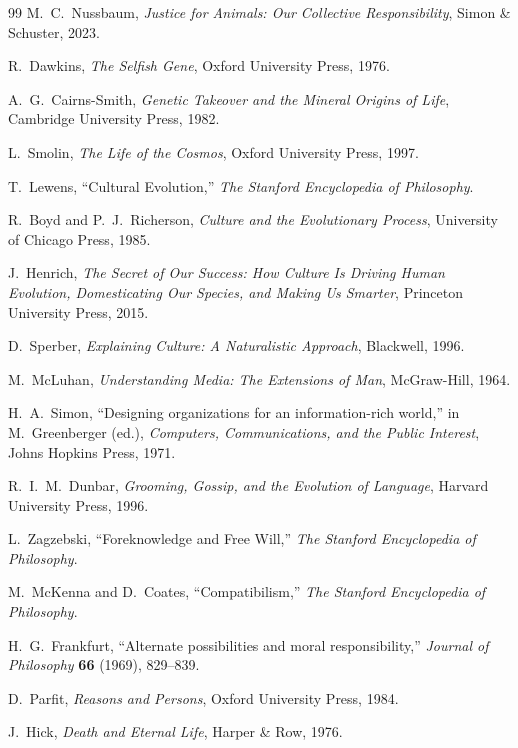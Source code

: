 \documentclass[11pt]{article}
\theoremstyle{remark}
\theoremstyle{plain}
\begin{document}
\begin{thebibliography}{99}
M.\ C.\ Nussbaum,
\emph{Justice for Animals: Our Collective Responsibility},
Simon \& Schuster, 2023.

R.\ Dawkins,
\emph{The Selfish Gene},
Oxford University Press, 1976.

A.\ G.\ Cairns-Smith,
\emph{Genetic Takeover and the Mineral Origins of Life},
Cambridge University Press, 1982.

L.\ Smolin,
\emph{The Life of the Cosmos},
Oxford University Press, 1997.

T.\ Lewens,
``Cultural Evolution,''
\emph{The Stanford Encyclopedia of Philosophy}.

R.\ Boyd and P.\ J.\ Richerson,
\emph{Culture and the Evolutionary Process},
University of Chicago Press, 1985.

J.\ Henrich,
\emph{The Secret of Our Success: How Culture Is Driving Human Evolution, Domesticating Our Species, and Making Us Smarter},
Princeton University Press, 2015.

D.\ Sperber,
\emph{Explaining Culture: A Naturalistic Approach},
Blackwell, 1996.

M.\ McLuhan,
\emph{Understanding Media: The Extensions of Man},
McGraw-Hill, 1964.

H.\ A.\ Simon,
``Designing organizations for an information-rich world,''
in M.\ Greenberger (ed.),
\emph{Computers, Communications, and the Public Interest},
Johns Hopkins Press, 1971.

R.\ I.\ M.\ Dunbar,
\emph{Grooming, Gossip, and the Evolution of Language},
Harvard University Press, 1996.

L.\ Zagzebski,
``Foreknowledge and Free Will,''
\emph{The Stanford Encyclopedia of Philosophy}.

M.\ McKenna and D.\ Coates,
``Compatibilism,''
\emph{The Stanford Encyclopedia of Philosophy}.

H.\ G.\ Frankfurt,
``Alternate possibilities and moral responsibility,''
\emph{Journal of Philosophy} \textbf{66} (1969), 829--839.

D.\ Parfit,
\emph{Reasons and Persons},
Oxford University Press, 1984.

J.\ Hick,
\emph{Death and Eternal Life},
Harper \& Row, 1976.


\end{thebibliography}
\end{document}
